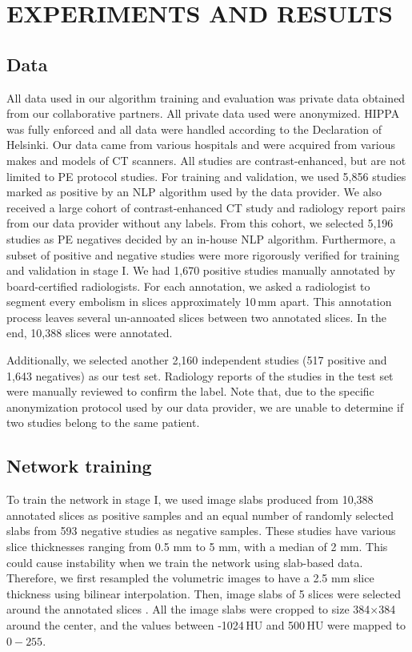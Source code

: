 \documentclass{midl} %
\begin{document}
\section{EXPERIMENTS AND RESULTS}
\label{sec:results}

\subsection{Data}
\label{ssec:data}

All data used in our algorithm training and evaluation was private data obtained from our collaborative partners. All private data used were anonymized. HIPPA was fully enforced and all data were handled according to the Declaration of Helsinki. Our data came from various hospitals and were acquired from various makes and models of CT scanners. All studies are contrast-enhanced, but are not limited to PE protocol studies. For training and validation, we used 5,856 studies marked as positive by an NLP algorithm used by the data provider. We also received a large cohort of contrast-enhanced CT study and radiology report pairs from our data provider without any labels. From this cohort, we selected 5,196 studies as PE negatives decided by an in-house NLP algorithm. Furthermore, a subset of positive and negative studies were more rigorously verified for training and validation in stage I. We had 1,670 positive studies manually annotated by board-certified radiologists. For each annotation, we asked a radiologist to segment every embolism in slices approximately 10\,mm apart. This annotation process leaves several un-annoated slices between two annotated slices. In the end, 10,388 slices were annotated. 

Additionally, we selected another 2,160 independent studies (517 positive and 1,643 negatives) as our test set. Radiology reports of the studies in the test set were manually reviewed to confirm the label. Note that, due to the specific anonymization protocol used by our data provider, we are unable to determine if two studies belong to the same patient. 




\subsection{Network training}
\label{ssec:training}

To train the network in stage I, we used image slabs produced from 10,388 annotated slices as positive samples and an equal number of randomly selected slabs from 593 negative studies as negative samples. These studies have various slice thicknesses ranging from 0.5 mm to 5 mm, with a median of 2 mm. This could cause instability when we train the network using slab-based data. Therefore, we first resampled the volumetric images to have a 2.5 mm slice thickness using bilinear interpolation. Then, image slabs of 5 slices were selected around the annotated slices . All the image slabs were cropped to size 384$\times$384 around the center, and the values between -1024\,HU and 500\,HU were mapped to $0 - 255$.
\end{document}

